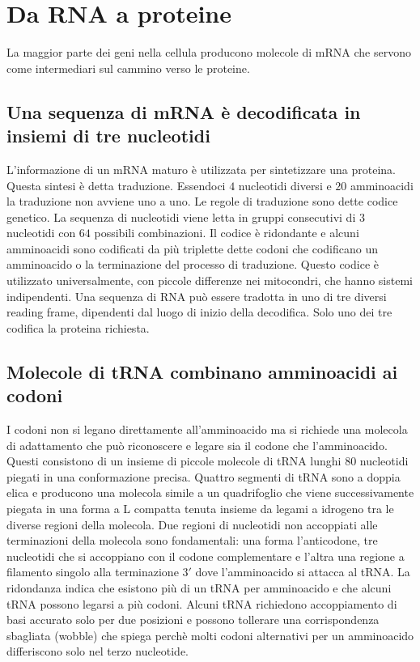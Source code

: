 \section{Da RNA a proteine}
La maggior parte dei geni nella cellula producono molecole di mRNA che servono come intermediari sul cammino verso le proteine. 
\subsection{Una sequenza di mRNA \`e decodificata in insiemi di tre nucleotidi}
L'informazione di un mRNA maturo \`e utilizzata per sintetizzare una proteina. Questa sintesi \`e detta traduzione. Essendoci $4$ nucleotidi diversi e $20$ amminoacidi la traduzione non
avviene uno a uno. Le regole di traduzione sono dette codice genetico. La sequenza di nucleotidi viene letta in gruppi consecutivi di $3$ nucleotidi con $64$ possibili combinazioni. 
Il codice \`e ridondante e alcuni amminoacidi sono codificati da pi\`u triplette dette codoni che codificano un amminoacido o la terminazione del processo di traduzione. Questo codice
\`e utilizzato universalmente, con piccole differenze nei mitocondri, che hanno sistemi indipendenti. Una sequenza di RNA pu\`o essere tradotta in uno di tre diversi reading frame, 
dipendenti dal luogo di inizio della decodifica. Solo uno dei tre codifica la proteina richiesta. 
\subsection{Molecole di tRNA combinano amminoacidi ai codoni}
I codoni non si legano direttamente all'amminoacido ma si richiede una molecola di adattamento che pu\`o riconoscere e legare sia il codone che l'amminoacido. Questi consistono di un
insieme di piccole molecole di tRNA lunghi $80$ nucleotidi piegati in una conformazione precisa. Quattro segmenti di tRNA sono a doppia elica e producono una molecola simile a un
quadrifoglio che viene successivamente piegata in una forma a L compatta tenuta insieme da legami a idrogeno tra le diverse regioni della molecola. Due regioni di nucleotidi non
accoppiati alle terminazioni della molecola sono fondamentali: una forma l'anticodone, tre nucleotidi che si accoppiano con il codone complementare e l'altra una regione a filamento
singolo alla terminazione $3'$ dove l'amminoacido si attacca al tRNA. La ridondanza indica che esistono pi\`u di un tRNA per amminoacido e che alcuni tRNA possono legarsi a pi\`u codoni.
Alcuni tRNA richiedono accoppiamento di basi accurato solo per due posizioni e possono tollerare una corrispondenza sbagliata (wobble) che spiega perch\`e molti codoni 
alternativi per un amminoacido differiscono solo nel terzo nucleotide. 
